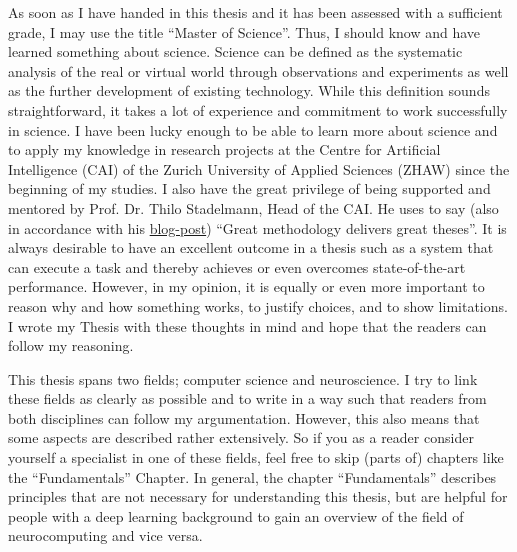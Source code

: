 \small
As soon as I have handed in this thesis and it has been assessed with a sufficient grade, I may use the title ``Master of Science''.
Thus, I should know and have learned something about science.
Science can be defined as the systematic analysis of the real or virtual world through observations and experiments as well as the further development of existing technology.
While this definition sounds straightforward, it takes a lot of experience and commitment to work successfully in science.
I have been lucky enough to be able to learn more about science and to apply my knowledge in research projects at the Centre for Artificial Intelligence (CAI) of the Zurich University of Applied Sciences (ZHAW) since the beginning of my studies.
I also have the great privilege of being supported and mentored by Prof. Dr. Thilo Stadelmann, Head of the CAI.
He uses to say (also in accordance with his \href{https://stdm.github.io/Great-methodology-delivers-great-theses/}{blog-post}) ``Great methodology delivers great theses''.
It is always desirable to have an excellent outcome in a thesis such as a system that can execute a task and thereby achieves or even overcomes state-of-the-art performance.
However, in my opinion, it is equally or even more important to reason why and how something works, to justify choices, and to show limitations.
I wrote my Thesis with these thoughts in mind and hope that the readers can follow my reasoning.

This thesis spans two fields; computer science and neuroscience.
I try to link these fields as clearly as possible and to write in a way such that readers from both disciplines can follow my argumentation.
However, this also means that some aspects are described rather extensively.
So if you as a reader consider yourself a specialist in one of these fields, feel free to skip (parts of) chapters like the ``Fundamentals'' Chapter.
In general, the chapter ``Fundamentals'' describes principles that are not necessary for understanding this thesis, but are helpful for people with a deep learning background to gain an overview of the field of neurocomputing and vice versa.

